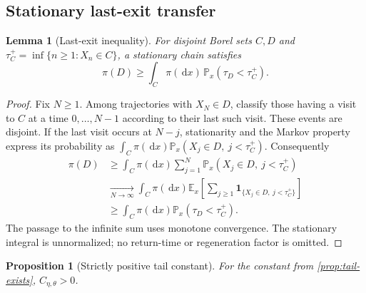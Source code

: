 \documentclass[11pt,a4paper]{article}
\numberwithin{equation}{section}
\newtheorem{lemma}[theorem]{Lemma}
\newtheorem{proposition}[theorem]{Proposition}
\theoremstyle{remark}
\newcommand{\E}{\mathbb E}
\newcommand{\Pp}{\mathbb P}
\newcommand{\ind}{\mathbf 1}
\newcommand{\dd}{\,\mathrm d}
\begin{document}
\subsection{Stationary last-exit transfer}

\begin{lemma}[Last-exit inequality]\label{lem:last-exit}
For disjoint Borel sets $C,D$ and
$\tau_C^+=\inf\{n\ge1:X_n\in C\}$, a stationary chain satisfies
\begin{equation}
 \pi(D)\ge\int_C\pi(\dd x)\,\Pp_x(\tau_D<\tau_C^+).
 \label{eq:last-exit-main}
\end{equation}
\end{lemma}

\begin{proof}
Fix $N\ge1$. Among trajectories with $X_N\in D$, classify those having
a visit to $C$ at a time $0,\ldots,N-1$ according to their last such
visit. These events are disjoint. If the last visit occurs at $N-j$,
stationarity and the Markov property express its probability as
$\int_C\pi(\dd x)\Pp_x(X_j\in D,\ j<\tau_C^+)$. Consequently
\begin{align}
 \pi(D)
 &\ge\int_C\pi(\dd x)\sum_{j=1}^N
               \Pp_x(X_j\in D,\ j<\tau_C^+)\nonumber\\
 &\xrightarrow[N\to\infty]{}
 \int_C\pi(\dd x)\E_x
     \left[\sum_{j\ge1}\ind_{\{X_j\in D,\ j<\tau_C^+\}}\right]
 \nonumber\\
 &\ge\int_C\pi(\dd x)\Pp_x(\tau_D<\tau_C^+).
 \label{eq:last-exit-proof}
\end{align}
The passage to the infinite sum uses monotone convergence. The stationary
integral is unnormalized; no return-time or regeneration factor is omitted.
\end{proof}

\begin{proposition}[Strictly positive tail constant]\label{prop:positive}
For the constant from \cref{prop:tail-exists},
$C_{\eta,\theta}>0$.
\end{proposition}
\end{document}
